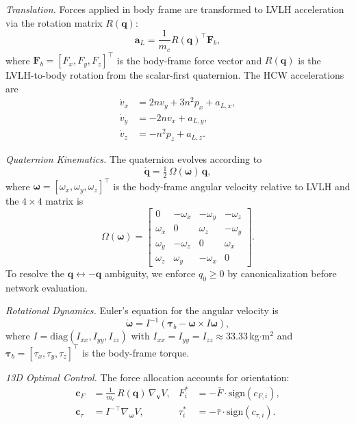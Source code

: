 \documentclass[letterpaper, 10 pt, conference]{ieeeconf}
\begin{document}
\textit{Translation.}
Forces applied in body frame are transformed to LVLH acceleration via the rotation matrix $R(\mathbf{q})$:
\begin{equation}\label{eq:13d_trans}
\mathbf{a}_L = \frac{1}{m_c} R(\mathbf{q})^\top \mathbf{F}_b,
\end{equation}
where $\mathbf{F}_b = [F_x, F_y, F_z]^\top$ is the body-frame force vector and $R(\mathbf{q})$ is the LVLH-to-body rotation from the scalar-first quaternion. The HCW accelerations are
\begin{align}\label{eq:hcw3d}
\dot{v}_x &= 2nv_y + 3n^2 p_x + a_{L,x}, \nonumber\\
\dot{v}_y &= -2nv_x + a_{L,y}, \\
\dot{v}_z &= -n^2 p_z + a_{L,z}. \nonumber
\end{align}

\textit{Quaternion Kinematics.}
The quaternion evolves according to
\begin{equation}\label{eq:qdot}
\dot{\mathbf{q}} = \tfrac{1}{2}\,\Omega(\bm{\omega})\,\mathbf{q},
\end{equation}
where $\bm{\omega} = [\omega_x, \omega_y, \omega_z]^\top$ is the body-frame angular velocity relative to LVLH and the $4\times4$ matrix is
\begin{equation}\label{eq:omega_mat}
\Omega(\bm{\omega}) = \begin{bmatrix}
0 & -\omega_x & -\omega_y & -\omega_z \\
\omega_x & 0 & \omega_z & -\omega_y \\
\omega_y & -\omega_z & 0 & \omega_x \\
\omega_z & \omega_y & -\omega_x & 0
\end{bmatrix}\!.
\end{equation}
To resolve the $\mathbf{q} \leftrightarrow -\mathbf{q}$ ambiguity, we enforce $q_0 \geq 0$ by canonicalization before network evaluation.

\textit{Rotational Dynamics.}
Euler's equation for the angular velocity is
\begin{equation}\label{eq:euler}
\dot{\bm{\omega}} = I^{-1}\!\left(\bm{\tau}_b - \bm{\omega} \times I\bm{\omega}\right)\!,
\end{equation}
where $I = \mathrm{diag}(I_{xx}, I_{yy}, I_{zz})$ with $I_{xx} = I_{yy} = I_{zz} \approx 33.33$\,kg$\cdot$m$^2$ and $\bm{\tau}_b = [\tau_x, \tau_y, \tau_z]^\top$ is the body-frame torque.

\textit{13D Optimal Control.}
The force allocation accounts for orientation:
\begin{align}\label{eq:13d_control}
\mathbf{c}_F &= \tfrac{1}{m_c}\,R(\mathbf{q})\,\nabla_{\mathbf{v}} V, & F_i^* &= -\bar{F}\cdot\mathrm{sign}(c_{F,i}), \nonumber\\
\mathbf{c}_\tau &= I^{-\!\top}\!\nabla_{\bm{\omega}} V, & \tau_i^* &= -\bar{\tau}\cdot\mathrm{sign}(c_{\tau,i}).
\end{align}
\end{document}
